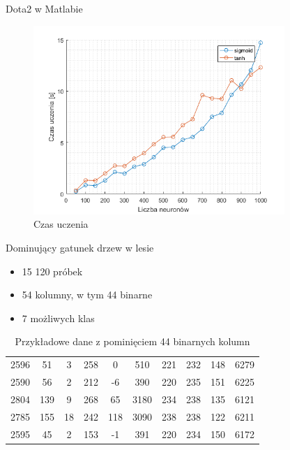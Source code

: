 \documentclass{beamer}
\begin{document}
\begin{frame}{Dota2 w Matlabie}
\begin{figure}[H]
\centering
\includegraphics[width=0.85\textwidth]{dota_wydajnosc.png}
\caption{Czas uczenia}
\end{figure}
\end{frame}

\begin{frame}{Dominujący gatunek drzew w lesie}
\begin{itemize}
\item 15 120 próbek
\item 54 kolumny, w tym 44 binarne
\item 7 możliwych klas
\end{itemize}
\begin{table}[H]
\caption{Przykładowe dane z pominięciem 44 binarnych kolumn}
\begin{tabular}{|c|c|c|c|c|c|c|c|c|c|}
\hline
2596 & 51 & 3 & 258 & 0 & 510 & 221 & 232 & 148 & 6279 \\
2590 & 56 & 2 & 212 & -6 & 390 & 220 & 235 & 151 & 6225 \\
2804 & 139 & 9 & 268 & 65 & 3180 & 234 & 238 & 135 & 6121 \\
2785 & 155 & 18 & 242 & 118 & 3090 & 238 & 238 & 122 & 6211 \\
2595 & 45 & 2 & 153 & -1 & 391 & 220 & 234 & 150 & 6172 \\
\hline
\end{tabular}
\end{table}
\end{frame}
\end{document}
